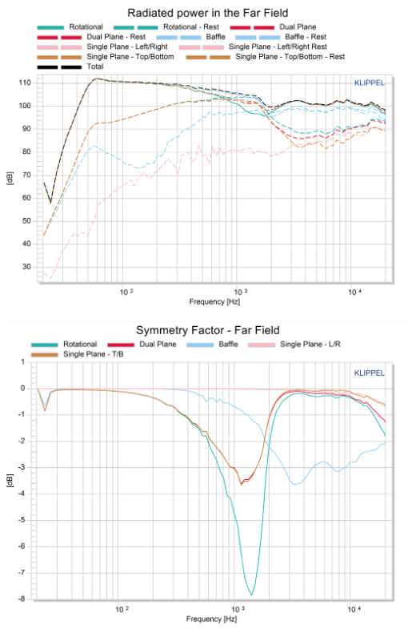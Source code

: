 \documentclass{report}
\begin{document}
\begin{minipage}{0.5\textwidth}
\begin{center}
	\includegraphics[width=\textwidth]{Sym/Rad_Pow_studio} 
    \captionsetup{hypcap=false} 
	\label{fig:rad_pow_studio}
\end{center}
\end{minipage}
\begin{minipage}{0.5\textwidth}
\begin{center}
	\includegraphics[width=\textwidth]{Sym/Sym_Fact_studio} 
    \captionsetup{hypcap=false} 
	\label{fig:sym_fact_studio}
\end{center}
\end{minipage}
\vspace{0.1cm}
\end{document}
